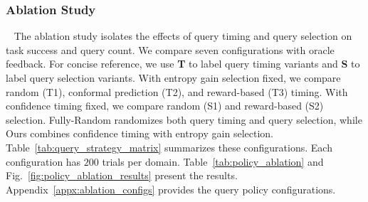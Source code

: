 




\subsubsection{Ablation Study}~\label{exp:when_what_random}\label{exp:policy_ablation}
The ablation study isolates the effects of query timing and query selection on task success and query count. We compare seven configurations with oracle feedback. For concise reference, we use \textbf{T} to label query timing variants and \textbf{S} to label query selection variants. With entropy gain selection fixed, we compare random (T1), conformal prediction (T2), and reward-based (T3) timing. With confidence timing fixed, we compare random (S1) and reward-based (S2) selection. Fully-Random randomizes both query timing and query selection, while Ours combines confidence timing with entropy gain selection. Table~\ref{tab:query_strategy_matrix} summarizes these configurations. Each configuration has $200$ trials per domain. Table~\ref{tab:policy_ablation} and Fig.~\ref{fig:policy_ablation_results} present the results. Appendix~\ref{appx:ablation_configs} provides the query policy configurations.

